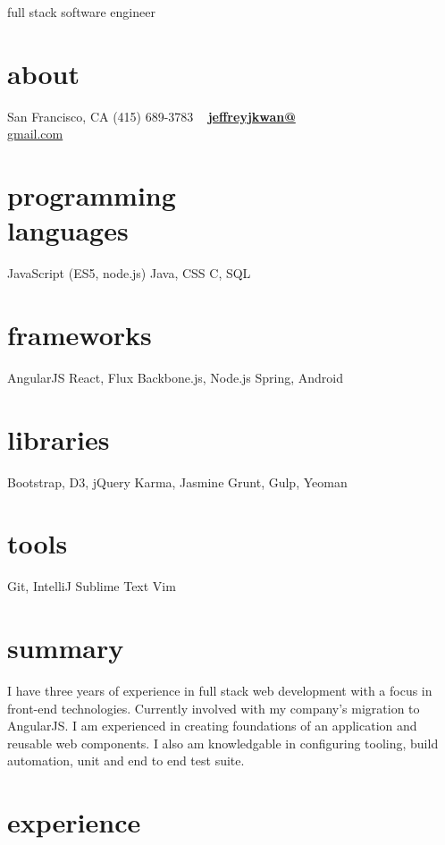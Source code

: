 \documentclass[print]{friggeri-cv}
\begin{document}
       {full stack software engineer}


\begin{aside}
  \section{about}
    San Francisco, CA
    (415) 689-3783
    ~
    \href{mailto:jeffreyjkwan@gmail.com}{\textbf{jeffreyjkwan@}\\gmail.com}
  \section{programming\\languages}
    JavaScript
    (ES5, node.js)
    Java, CSS
    C, SQL
  \section{frameworks}
    AngularJS
    React, Flux
    Backbone.js, Node.js
    Spring, Android
  \section{libraries}
    Bootstrap, D3, jQuery
    Karma, Jasmine
    Grunt, Gulp, Yeoman
  \section{tools}
    Git, IntelliJ
    Sublime Text
    Vim
\end{aside}

\section{summary}

I have three years of experience in full stack web development with a focus in front-end technologies. Currently involved with my company's migration to AngularJS. I am experienced in creating foundations of an application and reusable web components. I also am knowledgable in configuring tooling, build automation, unit and end to end test suite.

\section{experience}
\end{document}
